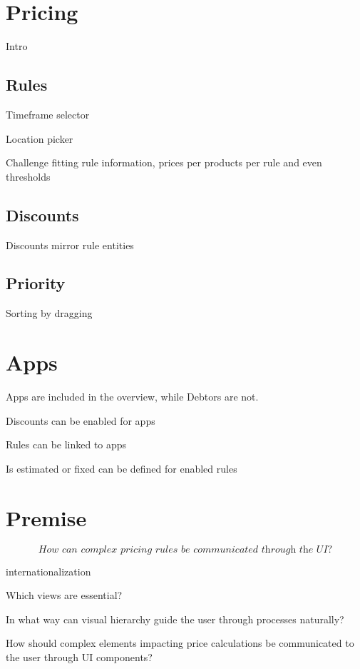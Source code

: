 %
\section{Pricing}
Intro

\subsection{Rules}
Timeframe selector

Location picker

Challenge fitting rule information, prices per products per rule and even thresholds

\subsection{Discounts}
Discounts mirror rule entities

\subsection{Priority}
Sorting by dragging

%
\section{Apps}
Apps are included in the overview, while Debtors are not.

Discounts can be enabled for apps

Rules can be linked to apps

Is estimated or fixed can be defined for enabled rules


\section{Premise}
\[\textit{How can complex pricing rules be communicated through the UI?}\]

internationalization

Which views are essential?

In what way can visual hierarchy guide the user through processes naturally?

How should complex elements impacting price calculations be communicated to the user through UI components?
